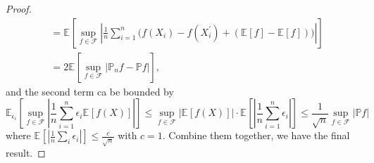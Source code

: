 \begin{proof}
\[\begin{split}
      &= \mathbb{E}_{}\left[\sup _{f\in \mathscr{F} } \left\vert \frac{1}{n}\sum_{i=1}^{n} \big( f(X_i) - f(X_i^{\prime} ) + (\mathbb{E}_{}\left[f \right] - \mathbb{E}_{}\left[f \right] ) \big) \right\vert  \right]\\
      &= 2 \mathbb{E}_{}\left[\sup _{f\in \mathscr{F} } \left\vert \mathbb{P} _n f - \mathbb{P} f \right\vert  \right] ,
    \end{split}
  \]
  and the second term ca be bounded by
  \[
    \mathbb{E}_{\epsilon _i}\left[\sup _{f\in \mathscr{F} } \left\vert \frac{1}{n}\sum_{i=1}^{n} \epsilon _i \mathbb{E}_{}\left[f(X) \right] \right\vert \right]
    \leq \sup _{f\in \mathscr{F} } \left\vert \mathbb{E}_{}\left[f(X) \right]  \right\vert \cdot \mathbb{E}_{}\left[\left\vert \frac{1}{n} \sum_{i=1}^{n} \epsilon _i \right\vert \right]
    \leq \frac{1}{\sqrt{n} } \sup _{f\in \mathscr{F} } \vert \mathbb{P} f \vert
  \]
  where \(\mathbb{E}_{}\left[\left\vert \frac{1}{n} \sum_{i} \epsilon _i \right\vert \right] \leq \frac{c}{\sqrt{n} } \) with \(c = 1\). Combine them together, we have the final result.
\end{proof}